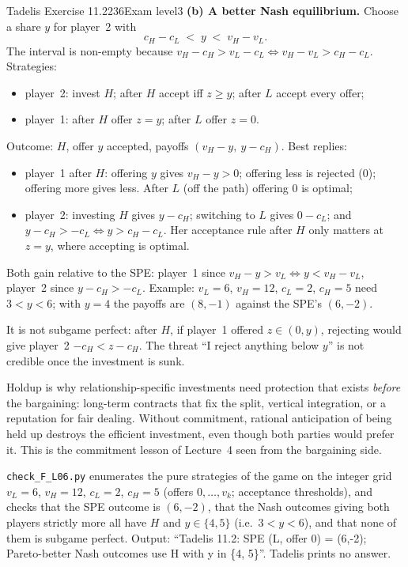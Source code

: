 \begin{exsol}{Tadelis Exercise 11.2}{236}{Exam level}{3}
\textbf{(b) A better Nash equilibrium.} Choose a share $y$ for player~2 with
\[
  c_H - c_L \;<\; y \;<\; v_H - v_L .
\]
The interval is non-empty because $v_H - c_H > v_L - c_L \iff v_H - v_L > c_H - c_L$. Strategies:
\begin{itemize}
  \item player~2: invest $H$; after $H$ accept iff $z \ge y$; after $L$ accept every offer;
  \item player~1: after $H$ offer $z = y$; after $L$ offer $z = 0$.
\end{itemize}
Outcome: $H$, offer $y$ accepted, payoffs $(v_H - y,\ y - c_H)$. Best replies:
\begin{itemize}
  \item player~1 after $H$: offering $y$ gives $v_H - y > 0$; offering less is rejected ($0$); offering
  more gives less. After $L$ (off the path) offering $0$ is optimal;
  \item player~2: investing $H$ gives $y - c_H$; switching to $L$ gives $0 - c_L$; and $y - c_H > -c_L
  \iff y > c_H - c_L$. Her acceptance rule after $H$ only matters at $z = y$, where accepting is optimal.
\end{itemize}
Both gain relative to the SPE: player~1 since $v_H - y > v_L \iff y < v_H - v_L$, player~2 since
$y - c_H > -c_L$. Example: $v_L = 6$, $v_H = 12$, $c_L = 2$, $c_H = 5$ need $3 < y < 6$; with $y = 4$ the
payoffs are $(8, -1)$ against the SPE's $(6, -2)$.

It is not subgame perfect: after $H$, if player~1 offered $z \in (0, y)$, rejecting would give
player~2 $-c_H < z - c_H$. The threat ``I reject anything below $y$'' is not credible once the
investment is sunk.

\interp Holdup is why relationship-specific investments need protection that exists \emph{before}
the bargaining: long-term contracts that fix the split, vertical integration, or a reputation for
fair dealing. Without commitment, rational anticipation of being held up destroys the efficient
investment, even though both parties would prefer it. This is the commitment lesson of Lecture~4 seen
from the bargaining side.

\verify \texttt{check\_F\_L06.py} enumerates the pure strategies of the game on the integer grid
$v_L = 6$, $v_H = 12$, $c_L = 2$, $c_H = 5$ (offers $0,\dots,v_k$; acceptance thresholds), and checks that
the SPE outcome is $(6,-2)$, that the Nash outcomes giving both players strictly more all have $H$ and
$y \in \{4, 5\}$ (i.e.\ $3 < y < 6$), and that none of them is subgame perfect. Output: ``Tadelis 11.2:
SPE (L, offer 0) = (6,-2); Pareto-better Nash outcomes use H with y in \{4, 5\}''. Tadelis prints no answer.


\end{exsol}
